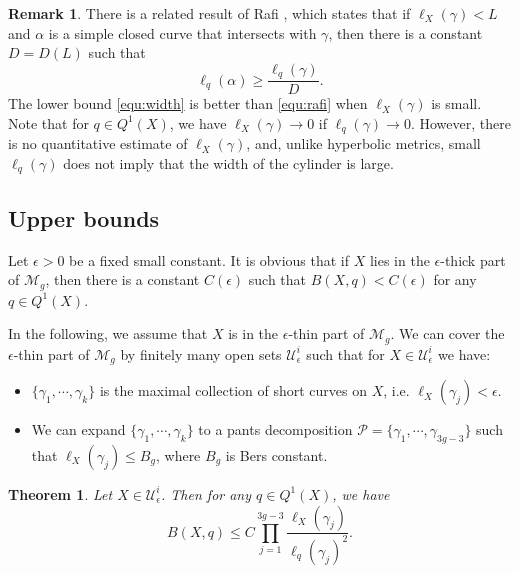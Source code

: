 \documentclass{amsart}
\theoremstyle{plain}
\newtheorem{theorem}{Theorem}[section]
\theoremstyle{definition}
\newtheorem{remark}{Remark}
\numberwithin{equation}{section}
\begin{document}
\begin{remark}
There is a related result of Rafi \cite[Theorem 2]{Rafi07}, which states that if $\ell_X(\gamma)< L$ and $\alpha$
is a simple closed curve that intersects with $\gamma$, then there is a constant $D=D(L)$ such that 
\begin{equation}\label{equ:rafi}
\ell_q(\alpha) \geq \frac{\ell_q(\gamma)}{D}.
\end{equation}
The lower bound \eqref{equ:width} is better than \eqref{equ:rafi} when $\ell_X(\gamma)$ is small. Note that for $q\in Q^1(X)$, we have $\ell_X(\gamma)\to 0$ if $\ell_q(\gamma) \to 0$. However, there is no quantitative estimate of   $\ell_X(\gamma)$, and, unlike hyperbolic metrics,  small $\ell_q(\gamma)$ does not imply that the width of the cylinder is large. 
\end{remark}

\subsection{Upper bounds}

Let $\epsilon>0$ be a fixed small constant. It is obvious that if $X$ lies in the $\epsilon$-thick part of $\mathcal{M}_g$, then there is a constant $C(\epsilon)$ such that $B(X,q)<C(\epsilon)$ for any $q\in Q^1(X)$. 

In the following, we assume that $X$ is in the $\epsilon$-thin part of $\mathcal{M}_g$. We can cover  the $\epsilon$-thin part of $\mathcal{M}_g$ by finitely many open sets $\mathcal{U}_\epsilon^i$ such that for $X\in \mathcal{U}_\epsilon^i$ we have:
\begin{itemize}
  \item $\{\gamma_1, \cdots, \gamma_k\}$ is the maximal collection of short curves on $X$, i.e. $\ell_X(\gamma_j)<\epsilon$.
  \item We can expand $\{\gamma_1, \cdots, \gamma_k\}$ to a pants decomposition $\mathcal{P}=\{\gamma_1, \cdots, \gamma_{3g-3}\}$ such that $\ell_X(\gamma_j)\leq B_g$, where $B_g$ is Bers constant.
\end{itemize}  

\begin{theorem}\label{thm:upper}
    Let $X\in \mathcal{U}_\epsilon^i$. Then for any $q\in Q^1(X)$, we have 
    $$B(X,q)\leq C \prod_{j=1}^{3g-3} \frac{\ell_X(\gamma_j)}{\ell_q(\gamma_j)^2}. $$
\end{theorem}
\end{document}
